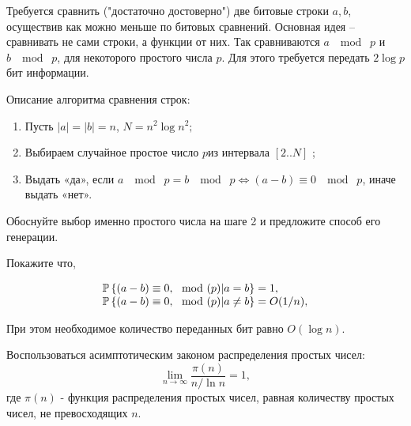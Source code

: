 
\begin{problem}

Требуется сравнить ("достаточно достоверно") две битовые строки $a,b$,  осуществив как можно меньше по битовых сравнений. Основная идея -- сравнивать не сами строки, а функции от них. Так сравниваются $a\; \mod\; p$ и $b\; \mod\; p$, для некоторого простого числа $p$. Для этого требуется передать $2\log p$ бит информации.

Описание алгоритма сравнения строк:

\begin{enumerate}
\item  Пусть $\left|a\right|=\left|b\right|=n$, $N=n^{2} \log  n^{2}; $ 

\item  Выбираем случайное простое число $p$из интервала $\left[2..N\right]$ ;

\item  Выдать «да», если $a\; \mod\; p=b\; \mod\; p\Leftrightarrow (a-b)\equiv 0\; \mod\; p$, иначе выдать «нет».
\end{enumerate}

\noindent  Обоснуйте выбор именно простого числа на шаге 2 и предложите способ его генерации.  

\noindent Покажите что,

\[\begin{array}{l} {\ensuremath{\mathrm{{\mathbb P}}}\left\{(a-b)\equiv 0,\mod(p)|a=b\right\}=1,} \\ {\mathrm{{\mathbb P}}\left\{(a-b)\equiv 0,\mod(p)|a\ne b\right\}=O(1/n),} \end{array}\] 
 
При этом необходимое количество переданных бит равно $O\left(\log  n\right)$.

\begin{ordre}

Воспользоваться асимптотическим законом распределения простых чисел:
\[\mathop{\lim }\limits_{n\to \infty } \frac{\pi \left(n\right)}{n/\ln n}  =1,\] 
где $\pi \left(n\right)$ - функция распределения простых чисел, равная количеству простых чисел, не превосходящих $n$.

\end{ordre}

\end{problem}

